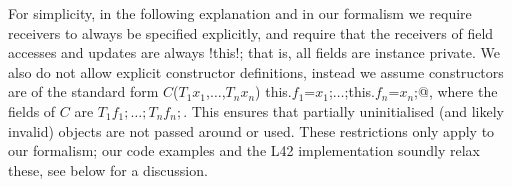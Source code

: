 For simplicity, in the following explanation and in our formalism
we require 
receivers to always be specified explicitly, and require that the receivers of field accesses and updates are always \Q!this!; that is, all fields are instance private.
We also do not allow explicit constructor definitions, instead we assume constructors are of the standard form \Q@$C$($T_1 x_1$,$\ldots$,$T_n x_n$) {this.$f_1$=$x_1$;$\ldots$;this.$f_n$=$x_n$;}@, where the fields of $C$ are $T_1 f_1;\ldots; T_n f_n;$. This ensures that partially uninitialised (and likely invalid) objects are not passed around or used. 
These restrictions only apply to our formalism; our code examples and the L42 implementation soundly relax these, see below for a discussion.%


